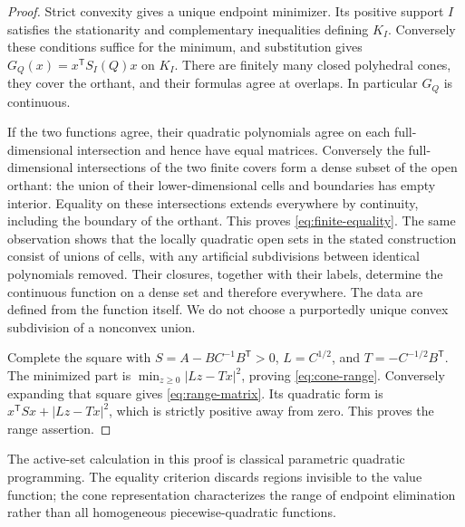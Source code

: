 \documentclass[11pt,reqno]{amsart}
\numberwithin{equation}{section}
\theoremstyle{definition}
\theoremstyle{remark}
\begin{document}
\begin{proof}
Strict convexity gives a unique endpoint minimizer. Its positive support $I$ satisfies the stationarity and complementary inequalities defining $K_I$. Conversely these conditions suffice for the minimum, and substitution gives $G_Q(x)=x^{\mathsf T}S_I(Q)x$ on $K_I$. There are finitely many closed polyhedral cones, they cover the orthant, and their formulas agree at overlaps. In particular $G_Q$ is continuous.

If the two functions agree, their quadratic polynomials agree on each full-dimensional intersection and hence have equal matrices. Conversely the full-dimensional intersections of the two finite covers form a dense subset of the open orthant: the union of their lower-dimensional cells and boundaries has empty interior. Equality on these intersections extends everywhere by continuity, including the boundary of the orthant. This proves \eqref{eq:finite-equality}. The same observation shows that the locally quadratic open sets in the stated construction consist of unions of cells, with any artificial subdivisions between identical polynomials removed. Their closures, together with their labels, determine the continuous function on a dense set and therefore everywhere. The data are defined from the function itself. We do not choose a purportedly unique convex subdivision of a nonconvex union.

Complete the square with
$S=A-BC^{-1}B^{\mathsf T}>0$, $L=C^{1/2}$, and $T=-C^{-1/2}B^{\mathsf T}$. The minimized part is $\min_{z\ge0}|Lz-Tx|^2$, proving \eqref{eq:cone-range}. Conversely expanding that square gives \eqref{eq:range-matrix}. Its quadratic form is $x^{\mathsf T}Sx+|Lz-Tx|^2$, which is strictly positive away from zero. This proves the range assertion.
\end{proof}
The active-set calculation in this proof is classical parametric quadratic programming. The equality criterion discards regions invisible to the value function; the cone representation characterizes the range of endpoint elimination rather than all homogeneous piecewise-quadratic functions.
\end{document}
